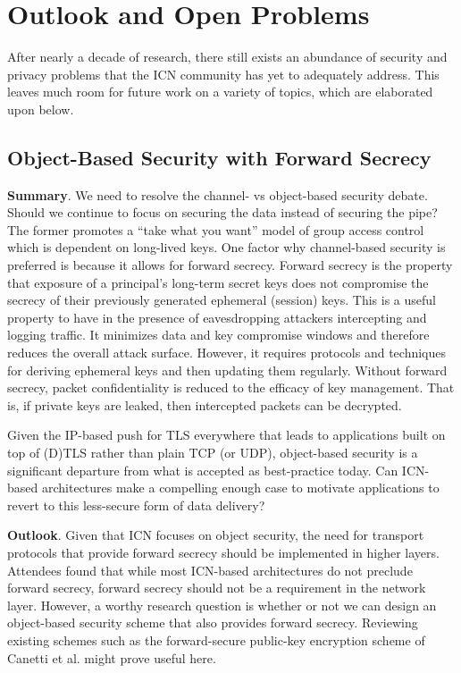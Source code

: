 \section{Outlook and Open Problems} \label{sec:outlook}
After nearly a decade of research, there still exists an abundance of security
and privacy problems that the ICN community has yet to adequately address.
This leaves much room for future work on a variety of topics, which are elaborated
upon below.

\subsection{Object-Based Security with Forward Secrecy}
{\bf Summary}. We need to resolve the channel- vs object-based security debate.
Should we continue to focus on securing the data instead of securing the pipe?
The former promotes a ``take what you want'' model of group access control which
is dependent on long-lived keys.
One factor why channel-based security is preferred is because it allows for forward
secrecy. Forward secrecy is the property that exposure of a principal's long-term secret keys
does not compromise the secrecy of their previously generated ephemeral (session)
keys. This is a useful property to have in the presence of eavesdropping attackers
intercepting and logging traffic. It minimizes data and key compromise windows and
therefore reduces the overall attack surface. However, it requires protocols and
techniques for deriving ephemeral keys and then updating them regularly.
Without forward secrecy, packet confidentiality is reduced to the efficacy of key management.
That is, if private keys are leaked, then intercepted packets can be decrypted.

Given the IP-based push for TLS everywhere that leads to applications built on top of (D)TLS
rather than plain TCP (or UDP), object-based security is a significant departure from
what is accepted as best-practice today. Can ICN-based architectures make a compelling
enough case to motivate applications to revert to this less-secure form of
data delivery?

{\bf Outlook}. Given that ICN focuses on object security, the need for transport
protocols that provide forward secrecy should be implemented in higher layers. Attendees
found that while most ICN-based architectures do not preclude forward secrecy, forward secrecy should
not be a requirement in the network layer. However, a worthy research question is
whether or not we can design an object-based security scheme that
also provides forward secrecy. Reviewing existing schemes such as the forward-secure public-key
encryption scheme of Canetti et al. \cite{canetti2003forward} might prove useful here.

